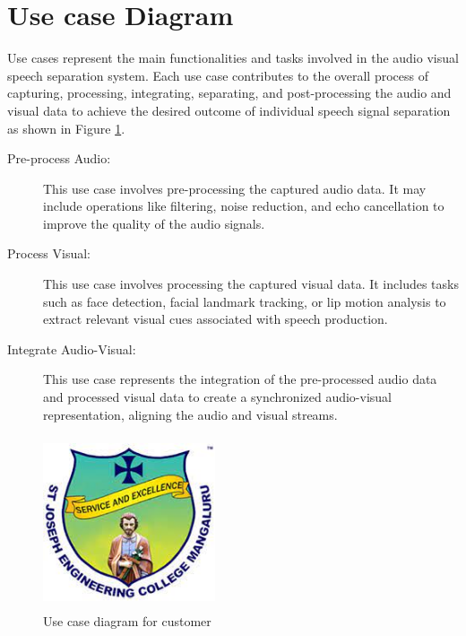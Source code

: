 \documentclass[12pt,a4paper]{report}
\begin{document}
\section{Use case Diagram}
Use cases represent the main functionalities and tasks involved in the audio visual speech separation system. Each use case contributes to the overall process of capturing, processing, integrating, separating, and post-processing the audio and visual data to achieve the desired outcome of individual speech signal separation as shown in Figure \ref{fig:4}.
\begin{description}
    \item [Pre-process Audio:] This use case involves pre-processing the captured audio data. It may include operations like filtering, noise reduction, and echo cancellation to improve the quality of the audio signals.

\item [Process Visual:] This use case involves processing the captured visual data. It includes tasks such as face detection, facial landmark tracking, or lip motion analysis to extract relevant visual cues associated with speech production.

\item [Integrate Audio-Visual:] This use case represents the integration of the pre-processed audio data and processed visual data to create a synchronized audio-visual representation, aligning the audio and visual streams.
\end{description}

\begin{figure}[hbtp]
\centering
\includegraphics[width=2in,height=2in]{./pic/sjeclogo.png}
\caption{Use case diagram for customer}
\label{fig:4}
\end{figure}




\newpage
\renewcommand{\bibname}{References}
\end{document}
